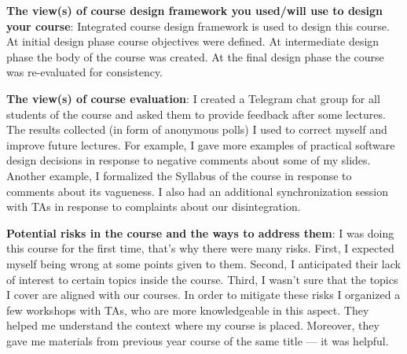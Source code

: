 \documentclass[nobrand,anonymous,nodate,nosecurity]{huawei}
\begin{document}
\newpage
\textbf{The view(s) of course design framework you used/will use to design your course}:
Integrated course design framework is used to design this course.
At initial design phase course objectives were defined.
At intermediate design phase the body of the course was created.
At the final design phase the course was re-evaluated for consistency.

\newpage
\textbf{The view(s) of course evaluation}:
I created a Telegram chat group for all students of the course and asked them
to provide feedback after some lectures. The results collected (in form of anonymous polls)
I used to correct myself and improve future lectures. For example, I gave
more examples of practical software design decisions in response to negative
comments about some of my slides. Another example, I formalized the Syllabus
of the course in response to comments about its vagueness. I also had
an additional synchronization session with TAs in response to complaints
about our disintegration.

\newpage
\textbf{Potential risks in the course and the ways to address them}:
I was doing this course for the first time, that's why there were many risks.
First, I expected myself being wrong at some points given to them.
Second, I anticipated their lack of interest to certain topics inside the course.
Third, I wasn't sure that the topics I cover are aligned with our courses.
In order to mitigate these risks I organized a few workshops with TAs,
who are more knowledgeable in this aspect. They helped me understand the
context where my course is placed. Moreover, they gave me materials
from previous year course of the same title --- it was helpful.




\end{document}
